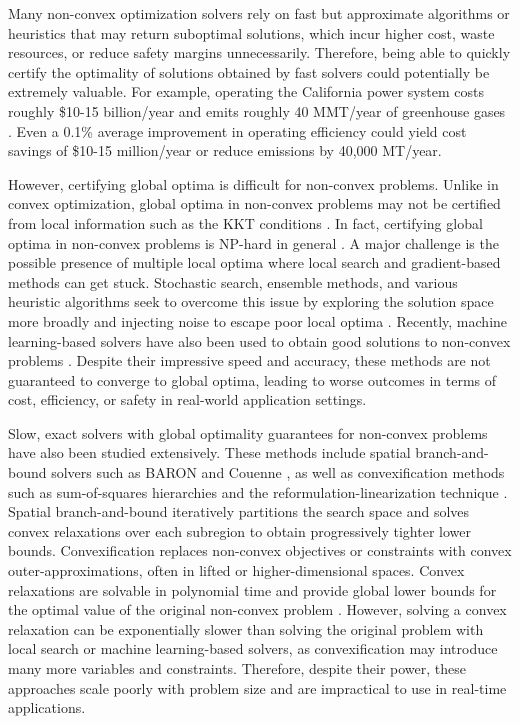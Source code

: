 \documentclass[10pt]{article} %
\theoremstyle{plain}
\theoremstyle{definition}
\theoremstyle{remark}
\begin{document}
Many non-convex optimization solvers rely on fast but approximate algorithms or heuristics that may return suboptimal solutions, which incur higher cost, waste resources, or reduce safety margins unnecessarily. Therefore, being able to quickly certify the optimality of solutions obtained by fast solvers could potentially be extremely valuable. For example, operating the California power system costs roughly \$10-15 billion/year and emits roughly 40 MMT/year of greenhouse gases \citep{CAISO_DMM_2023}. Even a 0.1\% average improvement in operating efficiency could yield cost savings of \$10-15 million/year or reduce emissions by 40,000 MT/year.

However, certifying global optima is difficult for non-convex problems. Unlike in convex optimization, global optima in non-convex problems may not be certified from local information such as the KKT conditions \citep{boyd2004convex}. In fact, certifying global optima in non-convex problems is NP-hard in general \citep{murty1985some}. 
A major challenge is the possible presence of multiple local optima where local search and gradient-based methods can get stuck. Stochastic search, ensemble methods, and various heuristic algorithms seek to overcome this issue by exploring the solution space more broadly and injecting noise to escape poor local optima \citep{dauphin2014identifying, kumar2020test}. Recently, machine learning-based solvers have also been used to obtain good solutions to non-convex problems \citep{donti2021dc3, jiang2024advancements}. Despite their impressive speed and accuracy, these methods are not guaranteed to converge to global optima, leading to worse outcomes in terms of cost, efficiency, or safety in real-world application settings.

Slow, exact solvers with global optimality guarantees for non-convex problems have also been studied extensively. These methods include spatial branch-and-bound solvers such as BARON and Couenne \citep{tawarmalani2005polyhedral, belotti2009branching}, as well as convexification methods such as sum-of-squares hierarchies and the reformulation-linearization technique \citep{lasserre2001global, ahmadi2019dsos, rudi2020finding, sherali2013reformulation}. Spatial branch-and-bound iteratively partitions the search space and solves convex relaxations over each subregion to obtain progressively tighter lower bounds. Convexification replaces non-convex objectives or constraints with convex outer-approximations, often in lifted or higher-dimensional spaces. Convex relaxations are solvable in polynomial time and provide global lower bounds for the optimal value of the original non-convex problem \citep{boyd2004convex}.
However, solving a convex relaxation can be exponentially slower than solving the original problem with local search or machine learning-based solvers, as convexification may introduce many more variables and constraints. Therefore, despite their power, these approaches scale poorly with problem size and are impractical to use in real-time applications.
\end{document}
